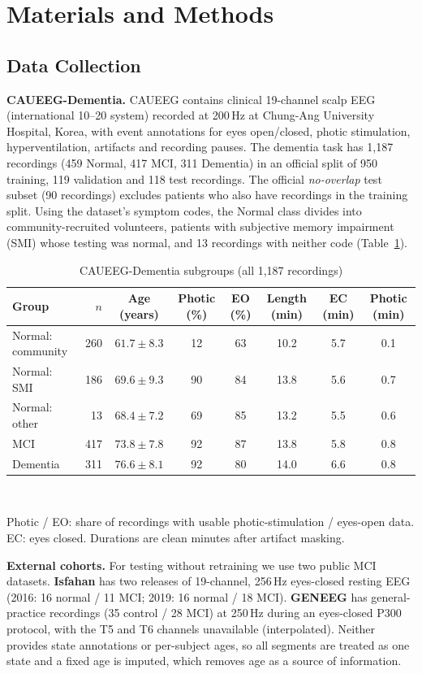 \section{Materials and Methods}

\subsection{Data Collection}

\textbf{CAUEEG-Dementia.} CAUEEG \citep{kim2023caueeg} contains clinical 19-channel scalp EEG (international
10--20 system) recorded at 200\,Hz at Chung-Ang University Hospital, Korea, with event annotations for eyes
open/closed, photic stimulation, hyperventilation, artifacts and recording pauses. The dementia task has
1,187 recordings (459 Normal, 417 MCI, 311 Dementia) in an official split of 950 training, 119 validation and
118 test recordings. The official \textit{no-overlap} test subset (90 recordings) excludes patients who also
have recordings in the training split. Using the dataset's symptom codes, the Normal class divides into
community-recruited volunteers, patients with subjective memory impairment (SMI) whose testing was normal, and
13 recordings with neither code (Table~\ref{tab:groups}).

\begin{table}[H]
\centering
\caption{CAUEEG-Dementia subgroups (all 1,187 recordings)}
\label{tab:groups}
\small
\begin{tabular}{lrcccccc}
\toprule
Group & $n$ & Age (years) & Photic (\%) & EO (\%) & Length (min) & EC (min) & Photic (min)\\
\midrule
Normal: community & 260 & $61.7\pm8.3$ & 12 & 63 & 10.2 & 5.7 & 0.1\\
Normal: SMI & 186 & $69.6\pm9.3$ & 90 & 84 & 13.8 & 5.6 & 0.7\\
Normal: other & 13 & $68.4\pm7.2$ & 69 & 85 & 13.2 & 5.5 & 0.6\\
MCI & 417 & $73.8\pm7.8$ & 92 & 87 & 13.8 & 5.8 & 0.8\\
Dementia & 311 & $76.6\pm8.1$ & 92 & 80 & 14.0 & 6.6 & 0.8\\
\bottomrule
\end{tabular}\\[2pt]
\parbox{\textwidth}{\scriptsize Photic / EO: share of recordings with usable photic-stimulation / eyes-open data.
EC: eyes closed. Durations are clean minutes after artifact masking.}
\end{table}

\textbf{External cohorts.} For testing without retraining we use two public MCI datasets. \textbf{Isfahan}
\citep{kashefpoor2016automatic,kashefpoor2019supervised} has two releases of 19-channel, 256\,Hz eyes-closed
resting EEG (2016: 16 normal / 11 MCI; 2019: 16 normal / 18 MCI). \textbf{GENEEG} \citep{geneeg2025} has
general-practice recordings (35 control / 28 MCI) at 250\,Hz during an eyes-closed P300 protocol, with the T5
and T6 channels unavailable (interpolated). Neither provides state annotations or per-subject ages, so all
segments are treated as one state and a fixed age is imputed, which removes age as a source of information.

